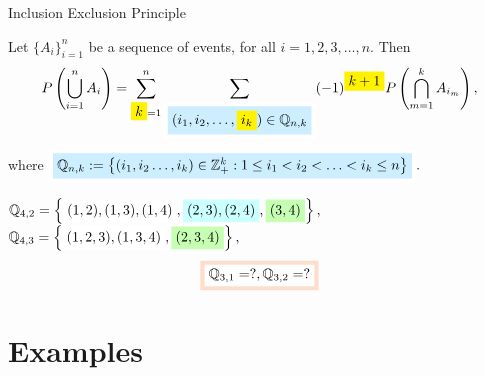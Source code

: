 \documentclass[compress]{beamer}
\begin{document}
%
%
%
\begin{frame}{Inclusion Exclusion Principle}

\begin{lemma}
Let  $\{A_i\}_{i=1}^{n}$ be a sequence of events, for all $i=1, 2, 3, \ldots, n $. Then 
$$  P\left(\bigcup_{i=1}^{n}A_i \right)= \sum_{\HLTY{k}=1}^{n } \sum_{\HLTEQ[white]{\HLTEQ[lightBlueTwo]{(i_1,i_2,\ldots,{\HLTY{i_k}})\in \mathbb{Q}_{n,k}}}} (-1)^{\HLTY{k+1}}P\left(\bigcap_{m=1}^{k} A_{i_m} \right) ,  $$
where   $ \HLTEQ[white]{\HLTEQ[lightBlueTwo]{\mathbb{Q}_{n,k}:= \left\{(i_1, i_2\ldots, i_k)\in \mathbb{Z}_{+}^k: 1\leq i_1<i_2<\ldots<i_{k}\leq n \right\} }}.$ 
\end{lemma}
$\mathbb{Q}_{4, 2}=\left\{   \HLTEQ{(1, 2), (1, 3), (1, 4)},  \HLTEQ[lightBlueOne]{(2, 3), (2, 4)},  \HLTEQ[lightGreenTwo]{(3, 4)}   \right\},$
$\mathbb{Q}_{4, 3}=\left\{   \HLTEQ{(1, 2, 3), (1, 3, 4)},  \HLTEQ[lightGreenTwo]{(2, 3, 4)}\right\},$\\
$$\HLTEQ[lightBrownOne]{ \HLTEQ[white]{  \mathbb{Q}_{3, 1}=?,\mathbb{Q}_{3, 2}=?}}$$



\end{frame}


\section{Examples}



\end{document}
